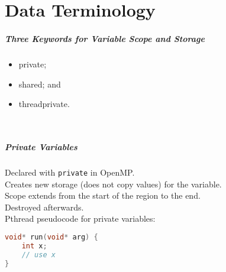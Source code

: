 \documentclass[aspectratio=43]{beamer}
\newenvironment{changemargin}[1]{%
  \begin{list}{}{%
    \setlength{\topsep}{0pt}%
    \setlength{\leftmargin}{#1}%
    \setlength{\rightmargin}{1em}
    \setlength{\listparindent}{\parindent}%
    \setlength{\itemindent}{\parindent}%
    \setlength{\parsep}{\parskip}%
  }%
  \item[]}{\end{list}}
\begin{document}
\part{Data Terminology}
\frame{\partpage}
\begin{frame}
  \frametitle{Three Keywords for Variable Scope and Storage}

  \begin{changemargin}{2.5cm}
\Large
      \begin{itemize}
        \item private;
        \item shared; and
        \item threadprivate.
      \end{itemize}
    ~\\[1em]
  \end{changemargin}
\end{frame}

\begin{frame}[fragile]
  \frametitle{Private Variables}

  \begin{changemargin}{2cm}
    Declared with {\tt private}  in OpenMP.\\[1em]
    Creates new storage (does not copy values) for the variable.\\[1em]
    Scope extends from the start of the region to the end. \\Destroyed afterwards.\\[2em]

  Pthread pseudocode for private variables:

  \begin{lstlisting}[language=C]
void* run(void* arg) {
    int x;
    // use x
}
  \end{lstlisting}
  \end{changemargin}

\end{frame}
\end{document}
